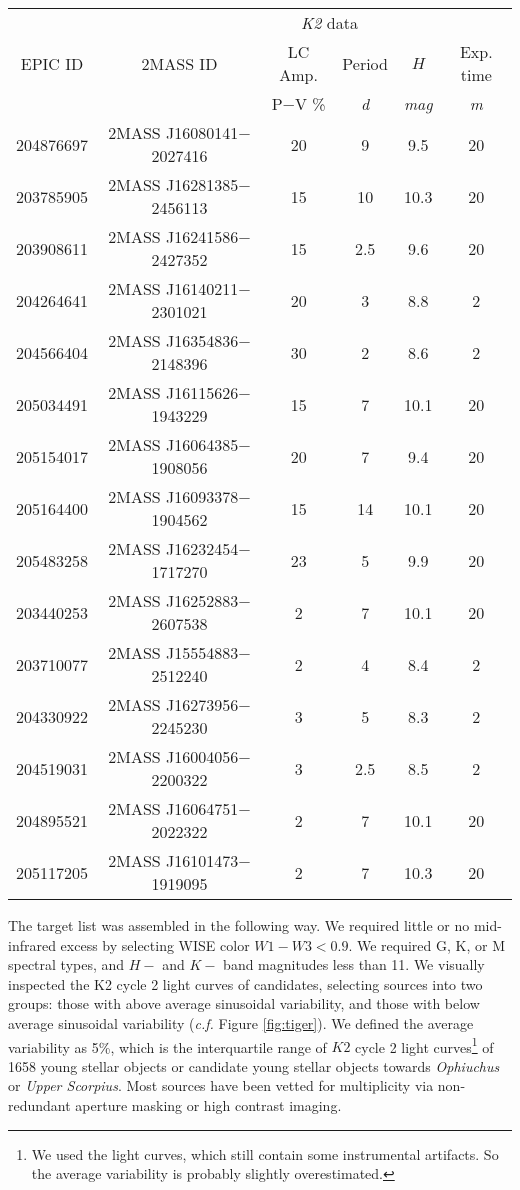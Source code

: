 \documentclass[11pt,aas_macros]{article}
\begin{document}
\begin{tabular}{cccccc}
\hline
& & \multicolumn{2}{c}{\emph{K2} data} \\
\cline{3-4}
EPIC ID & 2MASS ID & LC Amp. & Period & $H$ & Exp. time \\
  &   & P$-$V \% & \emph{d} & \emph{mag} & \emph{m} \\
\hline
204876697 & 2MASS J16080141$-$2027416 & 20  &  	9	& 9.5	 &   20  \\
203785905 & 2MASS J16281385$-$2456113 & 15  &  	10	& 10.3   & 	20  \\
203908611 & 2MASS J16241586$-$2427352 & 15  &  	2.5	& 9.6	 &   20  \\
204264641 & 2MASS J16140211$-$2301021 & 20  &  	3	& 8.8	 &   2  \\
204566404 & 2MASS J16354836$-$2148396 & 30  &  	2	& 8.6	 &   2  \\
205034491 & 2MASS J16115626$-$1943229 & 15  &  	7	& 10.1   & 	20  \\
205154017 & 2MASS J16064385$-$1908056 & 20  &  	7	& 9.4	 &   20  \\
205164400 & 2MASS J16093378$-$1904562 & 15  &  	14	& 10.1   & 	20  \\
205483258 & 2MASS J16232454$-$1717270 & 23  &  	5	& 9.9	 &   20  \\
203440253 & 2MASS J16252883$-$2607538 &  2  &   7	& 10.1   & 	20  \\
203710077 & 2MASS J15554883$-$2512240 &  2  &   4	& 8.4	 &   2  \\
204330922 & 2MASS J16273956$-$2245230 &  3  &   5	& 8.3	 &   2  \\
204519031 & 2MASS J16004056$-$2200322 &  3  &   2.5	& 8.5	 &   2  \\
204895521 & 2MASS J16064751$-$2022322 &  2  &   7	& 10.1   & 	20  \\
205117205 & 2MASS J16101473$-$1919095 &  2  &   7	& 10.3   & 	20  \\
\hline
\end{tabular}

\hfill \break

The target list was assembled in the following way.  We required little or no mid-infrared excess by selecting WISE color $W1-W3<0.9$.  We required G, K, or M spectral types, and $H-$ and $K-$ band magnitudes less than 11.  We visually inspected the K2 cycle 2 light curves of candidates, selecting sources into two groups: those with above average sinusoidal variability, and those with below average sinusoidal variability (\emph{c.f.} Figure \ref{fig:tiger}).  We defined the average variability as 5\%, which is the interquartile range of $K2$ cycle 2 light curves\footnote{We used the \citet{2014PASP..126..948V} light curves, which still contain some instrumental artifacts. So the average variability is probably slightly overestimated.} of 1658 young stellar objects or candidate young stellar objects towards \emph{Ophiuchus} or \emph{Upper Scorpius}.  Most sources have been vetted for multiplicity via non-redundant aperture masking or high contrast imaging.  
\end{document}
